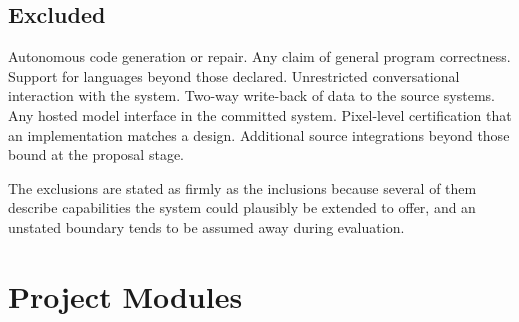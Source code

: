 \subsection*{Excluded}

Autonomous code generation or repair. Any claim of general program correctness.
Support for languages beyond those declared. Unrestricted conversational
interaction with the system. Two-way write-back of data to the source systems.
Any hosted model interface in the committed system. Pixel-level certification
that an implementation matches a design. Additional source integrations beyond
those bound at the proposal stage.

The exclusions are stated as firmly as the inclusions because several of them
describe capabilities the system could plausibly be extended to offer, and an
unstated boundary tends to be assumed away during evaluation.

\section{Project Modules}

